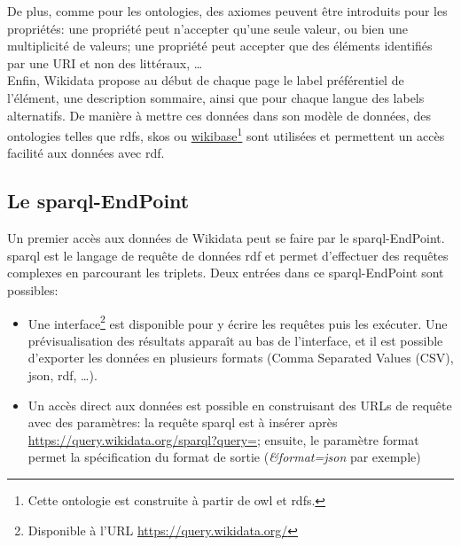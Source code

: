 De plus, comme pour les ontologies, des axiomes peuvent être introduits pour les propriétés: une propriété peut n'accepter qu'une seule valeur, ou bien une multiplicité de valeurs; une propriété peut accepter que des éléments identifiés par une URI et non des littéraux, \dots~\\

Enfin, Wikidata propose au début de chaque page le label préférentiel de l'élément, une description sommaire, ainsi que pour chaque langue des labels alternatifs. De manière à mettre ces données dans son modèle de données, des ontologies telles que \ac{rdfs}, \ac{skos} ou \href{http://wikiba.se/ontology#}{wikibase}\footnote{Cette ontologie est construite à partir de \ac{owl} et \ac{rdfs}.} sont utilisées et permettent un accès facilité aux données avec \ac{rdf}.

\subsection{\label{II-C-1-b}Le \ac{sparql}-EndPoint}

Un premier accès aux données de Wikidata peut se faire par le \ac{sparql}-EndPoint. \ac{sparql} est le langage de requête de données \ac{rdf} et permet d'effectuer des requêtes complexes en parcourant les triplets. Deux entrées dans ce \ac{sparql}-EndPoint sont possibles:
\begin{itemize}
	\item Une interface\footnote{Disponible à l'URL \url{https://query.wikidata.org/}} est disponible pour y écrire les requêtes puis les exécuter. Une prévisualisation des résultats apparaît au bas de l'interface, et il est possible d'exporter les données en plusieurs formats (Comma Separated Values (CSV), \ac{json}, \ac{rdf}, \dots).
	\item Un accès direct aux données est possible en construisant des URLs de requête avec des paramètres: la requête \ac{sparql} est à insérer après \url{https://query.wikidata.org/sparql?query=}; ensuite, le paramètre \og format\fg{} permet la spécification du format de sortie (\textit{\&format=json} par exemple)
\end{itemize}
\medskip

